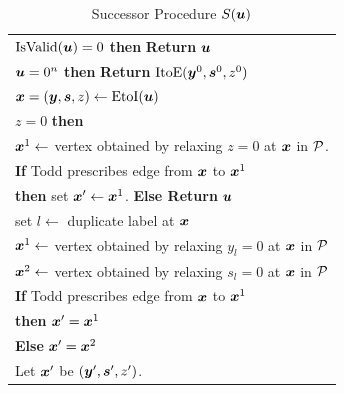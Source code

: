 \begin{table}
\begin{minipage}{0.73\textwidth}
\caption{Successor Procedure $S(\uu)$}\label{tab:S}
\begin{tabular}{|l|}
\hline
\hspace{0pt}{\bf If} $\isvalid(\uu)=0$ {\bf then} {\bf Return} $\uu$\\
\hspace{0pt}{\bf If} $\uu=0^n$ {\bf then} {\bf Return} $\ite(\yy^0,\ps^0,z^0)$\\
\hspace{0pt}$\xx=(\yy,\ps,z) \leftarrow \eti(\uu)$\\
\hspace{0pt}{\bf If} $z=0$ {\bf then} \\
\hspace{5pt} $\xx^1\leftarrow$ vertex obtained by relaxing $z=0$ at $\xx$ in $\CPol$. \\
\hspace{5pt} {\bf If} Todd \cite{todd1976orientation} prescribes edge from $\xx$ to $\xx^1$ \\
\hspace{10pt} {\bf then} set $\xx'\leftarrow \xx^1$. {\bf Else Return} $\uu$ \\
\hspace{0pt}{\bf Else} set $l\leftarrow $ duplicate label at $\xx$\\
\hspace{5pt} $\xx^1\leftarrow $ vertex obtained by relaxing $y_l=0$ at $\xx$ in $\CPol$ \\
\hspace{5pt} $\xx^2\leftarrow $ vertex obtained by relaxing $s_l=0$ at $\xx$ in $\CPol$ \\
\hspace{5pt} {\bf If} Todd \cite{todd1976orientation} prescribes edge from $\xx$ to $\xx^1$ \\
\hspace{10pt} {\bf then} $\xx'=\xx^1$ \\
\hspace{5pt} {\bf Else} $\xx'=\xx^2$\\
\hspace{0pt}Let $\xx'$ be $(\yy',\ps',z')$. \\

\end{tabular}
\end{minipage}
\end{table}
